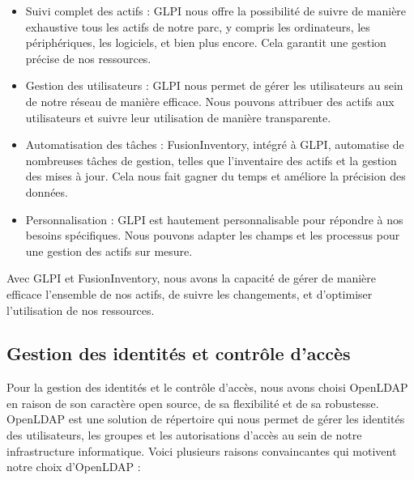 \begin{itemize}

\item Suivi complet des actifs : GLPI nous offre la possibilité de suivre de manière exhaustive tous les actifs de notre parc, y compris les ordinateurs, les périphériques, les logiciels, et bien plus encore. Cela garantit une gestion précise de nos ressources.

\item Gestion des utilisateurs : GLPI nous permet de gérer les utilisateurs au sein de notre réseau de manière efficace. Nous pouvons attribuer des actifs aux utilisateurs et suivre leur utilisation de manière transparente.

\item Automatisation des tâches : FusionInventory, intégré à GLPI, automatise de nombreuses tâches de gestion, telles que l'inventaire des actifs et la gestion des mises à jour. Cela nous fait gagner du temps et améliore la précision des données.

\item Personnalisation : GLPI est hautement personnalisable pour répondre à nos besoins spécifiques. Nous pouvons adapter les champs et les processus pour une gestion des actifs sur mesure.

\end{itemize}

Avec GLPI et FusionInventory, nous avons la capacité de gérer de manière efficace l'ensemble de nos actifs, de suivre les changements, et d'optimiser l'utilisation de nos ressources.




\subsection{Gestion des identités et contrôle d'accès}

Pour la gestion des identités et le contrôle d'accès, nous avons choisi OpenLDAP en raison de son caractère open source, de sa flexibilité et de sa robustesse. OpenLDAP est une solution de répertoire qui nous permet de gérer les identités des utilisateurs, les groupes et les autorisations d'accès au sein de notre infrastructure informatique. Voici plusieurs raisons convaincantes qui motivent notre choix d'OpenLDAP :

